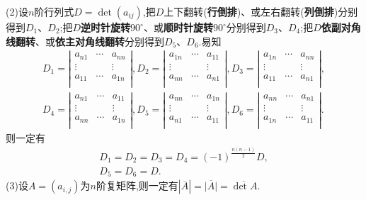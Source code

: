 \documentclass[../../main.tex]{subfiles}%
\begin{document}
\begin{proposition}
(2)设$n$阶行列式$D=\det(a_{ij})$,把$D$上下翻转(\textbf{行倒排})、或左右翻转(\textbf{列倒排})分别得到$D_1$、$D_2$;把$D$\textbf{逆时针旋转$90^{\circ}$}、或\textbf{顺时针旋转$90^{\circ}$}分别得到$D_3$、$D_4$;把$D$\textbf{依副对角线翻转}、或\textbf{依主对角线翻转}分别得到$D_5$、$D_6$.易知
\begin{align*}
D_1=\left| \begin{matrix}
a_{n1}&		\cdots&		a_{nn}\\
\vdots&		&		\vdots\\
a_{11}&		\cdots&		a_{1n}\\
\end{matrix} \right|,D_2=\left| \begin{matrix}
a_{1n}&		\cdots&		a_{11}\\
\vdots&		&		\vdots\\
a_{nn}&		\cdots&		a_{n1}\\
\end{matrix} \right|,D_3=\left| \begin{matrix}
a_{1n}&		\cdots&		a_{nn}\\
\vdots&		&		\vdots\\
a_{11}&		\cdots&		a_{n1}\\
\end{matrix} \right|,
\\
D_4=\left| \begin{matrix}
a_{n1}&		\cdots&		a_{11}\\
\vdots&		&		\vdots\\
a_{nn}&		\cdots&		a_{1n}\\
\end{matrix} \right|,D_5=\left| \begin{matrix}
a_{nn}&		\cdots&		a_{1n}\\
\vdots&		&		\vdots\\
a_{n1}&		\cdots&		a_{11}\\
\end{matrix} \right|,D_6=\left| \begin{matrix}
a_{nn}&		\cdots&		a_{n1}\\
\vdots&		&		\vdots\\
a_{1n}&		\cdots&		a_{11}\\
\end{matrix} \right|.
\nonumber
\end{align*}
则一定有
\begin{gather*}
D_1=D_2=D_3=D_4=\left( -1 \right) ^{\frac{n\left( n-1 \right)}{2}}D,
\\
D_5=D_6=D.
\nonumber
\end{gather*}
(3)设\(A=(a_{i,j})\)为\(n\)阶复矩阵,则一定有\(\left| \overline{A} \right|=\overline{\left| A \right|}=\overline{\det A}\).


\end{proposition}
\end{document}
